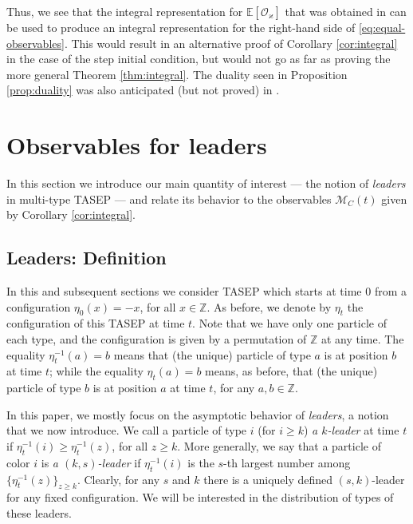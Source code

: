 \documentclass[11pt,reqno]{amsart}
\theoremstyle{definition}
\theoremstyle{remark}
\theoremstyle{remark}
\def\geq{\geqslant}
\renewcommand\ge{\geq}
\def\O{\mathcal{O}}
\def\Z{\mathbb Z}
\def\M{\mathcal M}
\numberwithin{equation}{section}
\begin{document}
	Thus, we see that the integral representation for $\mathbb{E} [\O_\varkappa]$ that was obtained in \cite{BW-observables} can be used to produce an integral representation for the right-hand side of \eqref{eq:equal-observables}. This would result in an alternative proof of Corollary \ref{cor:integral} in the case of the step initial condition, but would not go as far as proving the more general Theorem \ref{thm:integral}. The duality seen in Proposition \ref{prop:duality} was also anticipated (but not proved) in \cite[Section 6.3]{BW-observables}.  
	
	\section{Observables for leaders}
	
	In this section we introduce our main quantity of interest --- the notion of \textit{leaders} in multi-type TASEP --- and relate its behavior to the observables $\M_C (t)$ given by Corollary \ref{cor:integral}. 
	
	\subsection{Leaders: Definition}
	
	In this and subsequent sections we consider TASEP which starts at time $0$ from a configuration $\eta_0 (x)=-x$, for all $x \in \Z$. As before, we denote by $\eta_t$ the configuration of this TASEP at time $t$.
	Note that we have only one particle of each type, and the configuration is given by a permutation of $\Z$ at any time. The equality $\eta^{-1}_t (a) =b$ means that (the unique) particle of type $a$ is at position $b$ at time $t$; while the equality $\eta_t (a) =b$ means, as before, that (the unique) particle of type $b$ is at position $a$ at time $t$, for any $a,b \in \Z$. 
	
	In this paper, we mostly focus on the asymptotic behavior of \textit{leaders}, a notion that we now introduce. 
	We call a particle of type $i$ (for $i \ge k$) \textit{a $k$-leader} at time $t$ if $\eta^{-1}_t  (i) \ge \eta^{-1}_t  (z)$, for all $z \ge k$. More generally, we say that a particle of color $i$ is \textit{a $(k,s)$-leader} if $\eta^{-1}_t (i)$ is the $s$-th largest number among $\{ \eta^{-1}_t (z) \}_{z \ge k}$. Clearly, for any $s$ and $k$ there is a uniquely defined $(s,k)$-leader for any fixed configuration. We will be interested in the distribution of types of these leaders. 
	
\end{document}

